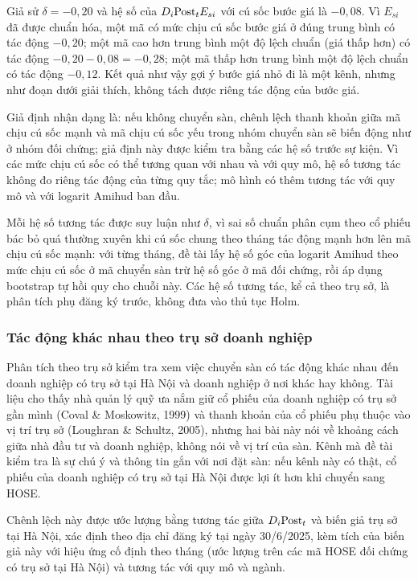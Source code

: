 \begin{vidu}
Giả sử $\delta = -0{,}20$ và hệ số của $D_i\mathrm{Post}_tE_{si}$ với cú sốc bước giá là $-0{,}08$. Vì $E_{si}$ đã được chuẩn hóa, một mã có mức chịu cú sốc bước giá ở đúng trung bình có tác động $-0{,}20$; một mã cao hơn trung bình một độ lệch chuẩn (giá thấp hơn) có tác động $-0{,}20 - 0{,}08 = -0{,}28$; một mã thấp hơn trung bình một độ lệch chuẩn có tác động $-0{,}12$. Kết quả như vậy gợi ý bước giá nhỏ đi là một kênh, nhưng như đoạn dưới giải thích, không tách được riêng tác động của bước giá.
\end{vidu}

Giả định nhận dạng là: nếu không chuyển sàn, chênh lệch thanh khoản giữa mã chịu cú sốc mạnh và mã chịu cú sốc yếu trong nhóm chuyển sàn sẽ biến động như ở nhóm đối chứng; giả định này được kiểm tra bằng các hệ số trước sự kiện. Vì các mức chịu cú sốc có thể tương quan với nhau và với quy mô, hệ số tương tác không đo riêng tác động của từng quy tắc; mô hình có thêm tương tác với quy mô và với logarit Amihud ban đầu.

Mỗi hệ số tương tác được suy luận như $\delta$, vì sai số chuẩn phân cụm theo cổ phiếu bác bỏ quá thường xuyên khi cú sốc chung theo tháng tác động mạnh hơn lên mã chịu cú sốc mạnh: với từng tháng, đề tài lấy hệ số góc của logarit Amihud theo mức chịu cú sốc ở mã chuyển sàn trừ hệ số góc ở mã đối chứng, rồi áp dụng bootstrap tự hồi quy cho chuỗi này. Các hệ số tương tác, kể cả theo trụ sở, là phân tích phụ đăng ký trước, không đưa vào thủ tục Holm.

\subsubsection*{Tác động khác nhau theo trụ sở doanh nghiệp}

Phân tích theo trụ sở kiểm tra xem việc chuyển sàn có tác động khác nhau đến doanh nghiệp có trụ sở tại Hà Nội và doanh nghiệp ở nơi khác hay không. Tài liệu cho thấy nhà quản lý quỹ ưa nắm giữ cổ phiếu của doanh nghiệp có trụ sở gần mình (Coval \& Moskowitz, 1999) và thanh khoản của cổ phiếu phụ thuộc vào vị trí trụ sở (Loughran \& Schultz, 2005), nhưng hai bài này nói về khoảng cách giữa nhà đầu tư và doanh nghiệp, không nói về vị trí của sàn. Kênh mà đề tài kiểm tra là sự chú ý và thông tin gắn với nơi đặt sàn: nếu kênh này có thật, cổ phiếu của doanh nghiệp có trụ sở tại Hà Nội được lợi ít hơn khi chuyển sang HOSE.

Chênh lệch này được ước lượng bằng tương tác giữa $D_i\mathrm{Post}_t$ và biến giả trụ sở tại Hà Nội, xác định theo địa chỉ đăng ký tại ngày 30/6/2025, kèm tích của biến giả này với hiệu ứng cố định theo tháng (ước lượng trên các mã HOSE đối chứng có trụ sở tại Hà Nội) và tương tác với quy mô và ngành.

